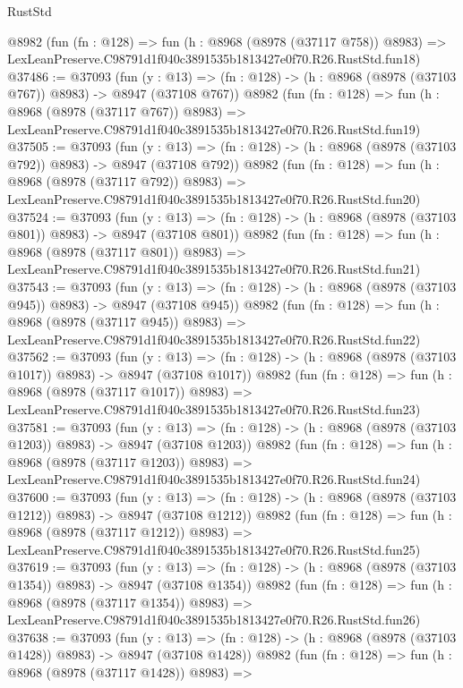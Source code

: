 \begin{lexlean}{RustStd}
\begin{coremodule}
    @8982
    (fun (fn : @128) =>
    fun (h : @8968 (@8978 (@37117 @758)) @8983) =>
    LexLeanPreserve.C98791d1f040c3891535b1813427e0f70.R26.RustStd.fun18)
@37486 := @37093
    (fun (y : @13) => (fn : @128) -> (h : @8968 (@8978 (@37103 @767)) @8983) -> @8947 (@37108 @767))
    @8982
    (fun (fn : @128) =>
    fun (h : @8968 (@8978 (@37117 @767)) @8983) =>
    LexLeanPreserve.C98791d1f040c3891535b1813427e0f70.R26.RustStd.fun19)
@37505 := @37093
    (fun (y : @13) => (fn : @128) -> (h : @8968 (@8978 (@37103 @792)) @8983) -> @8947 (@37108 @792))
    @8982
    (fun (fn : @128) =>
    fun (h : @8968 (@8978 (@37117 @792)) @8983) =>
    LexLeanPreserve.C98791d1f040c3891535b1813427e0f70.R26.RustStd.fun20)
@37524 := @37093
    (fun (y : @13) => (fn : @128) -> (h : @8968 (@8978 (@37103 @801)) @8983) -> @8947 (@37108 @801))
    @8982
    (fun (fn : @128) =>
    fun (h : @8968 (@8978 (@37117 @801)) @8983) =>
    LexLeanPreserve.C98791d1f040c3891535b1813427e0f70.R26.RustStd.fun21)
@37543 := @37093
    (fun (y : @13) => (fn : @128) -> (h : @8968 (@8978 (@37103 @945)) @8983) -> @8947 (@37108 @945))
    @8982
    (fun (fn : @128) =>
    fun (h : @8968 (@8978 (@37117 @945)) @8983) =>
    LexLeanPreserve.C98791d1f040c3891535b1813427e0f70.R26.RustStd.fun22)
@37562 := @37093
    (fun (y : @13) =>
    (fn : @128) -> (h : @8968 (@8978 (@37103 @1017)) @8983) -> @8947 (@37108 @1017))
    @8982
    (fun (fn : @128) =>
    fun (h : @8968 (@8978 (@37117 @1017)) @8983) =>
    LexLeanPreserve.C98791d1f040c3891535b1813427e0f70.R26.RustStd.fun23)
@37581 := @37093
    (fun (y : @13) =>
    (fn : @128) -> (h : @8968 (@8978 (@37103 @1203)) @8983) -> @8947 (@37108 @1203))
    @8982
    (fun (fn : @128) =>
    fun (h : @8968 (@8978 (@37117 @1203)) @8983) =>
    LexLeanPreserve.C98791d1f040c3891535b1813427e0f70.R26.RustStd.fun24)
@37600 := @37093
    (fun (y : @13) =>
    (fn : @128) -> (h : @8968 (@8978 (@37103 @1212)) @8983) -> @8947 (@37108 @1212))
    @8982
    (fun (fn : @128) =>
    fun (h : @8968 (@8978 (@37117 @1212)) @8983) =>
    LexLeanPreserve.C98791d1f040c3891535b1813427e0f70.R26.RustStd.fun25)
@37619 := @37093
    (fun (y : @13) =>
    (fn : @128) -> (h : @8968 (@8978 (@37103 @1354)) @8983) -> @8947 (@37108 @1354))
    @8982
    (fun (fn : @128) =>
    fun (h : @8968 (@8978 (@37117 @1354)) @8983) =>
    LexLeanPreserve.C98791d1f040c3891535b1813427e0f70.R26.RustStd.fun26)
@37638 := @37093
    (fun (y : @13) =>
    (fn : @128) -> (h : @8968 (@8978 (@37103 @1428)) @8983) -> @8947 (@37108 @1428))
    @8982
    (fun (fn : @128) =>
    fun (h : @8968 (@8978 (@37117 @1428)) @8983) =>

\end{coremodule}
\end{lexlean}
